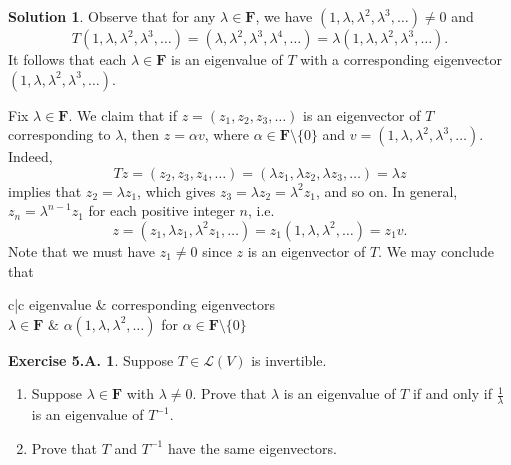\documentclass[12pt]{article}
\theoremstyle{definition}
\theoremstyle{exercise}
\newtheorem{exercise}{Exercise 5.A.}
\theoremstyle{solution}
\newtheorem*{solution}{Solution}
\newcommand{\lmap}{\mathcal{L}}
\newcommand{\F}{\mathbf{F}}
\begin{document}
\begin{solution}
    Observe that for any \( \lambda \in \F \), we have \( (1, \lambda, \lambda^2, \lambda^3, \ldots) \neq 0 \) and
    \[
        T(1, \lambda, \lambda^2, \lambda^3, \ldots) = (\lambda, \lambda^2, \lambda^3, \lambda^4, \ldots) = \lambda(1, \lambda, \lambda^2, \lambda^3, \ldots).
    \]
    It follows that each \( \lambda \in \F \) is an eigenvalue of \( T \) with a corresponding eigenvector \( (1, \lambda, \lambda^2, \lambda^3, \ldots) \).

    Fix \( \lambda \in \F \). We claim that if \( z = (z_1, z_2, z_3, \ldots) \) is an eigenvector of \( T \) corresponding to \( \lambda \), then \( z = \alpha v \), where \( \alpha \in \F \setminus \{ 0 \} \) and \( v = (1, \lambda, \lambda^2, \lambda^3, \ldots) \). Indeed,
    \[
        Tz = (z_2, z_3, z_4, \ldots) = (\lambda z_1, \lambda z_2, \lambda z_3, \ldots) = \lambda z
    \]
    implies that \( z_2 = \lambda z_1 \), which gives \( z_3 = \lambda z_2 = \lambda^2 z_1 \), and so on. In general, \( z_n = \lambda^{n-1} z_1 \) for each positive integer \( n \), i.e.\
    \[
        z = (z_1, \lambda z_1, \lambda^2 z_1, \ldots) = z_1 (1, \lambda, \lambda^2, \ldots) = z_1 v.
    \]
    Note that we must have \( z_1 \neq 0 \) since \( z \) is an eigenvector of \( T \). We may conclude that
    \begin{center}
        \begin{tblr}{c|c}
            eigenvalue & corresponding eigenvectors \\
            \hline
            \( \lambda \in \F \) & \( \alpha (1, \lambda, \lambda^2, \ldots) \) for \( \alpha \in \F \setminus \{ 0 \} \)
        \end{tblr}
    \end{center}
\end{solution}

\begin{exercise}
\label{ex:21}
    Suppose \( T \in \lmap(V) \) is invertible.
    \begin{enumerate}
        \item Suppose \( \lambda \in \F \) with \( \lambda \neq 0 \). Prove that \( \lambda \) is an eigenvalue of \( T \) if and only if \( \tfrac{1}{\lambda} \) is an eigenvalue of \( T^{-1} \).

        \item Prove that \( T \) and \( T^{-1} \) have the same eigenvectors.
    \end{enumerate}
\end{exercise}
\end{document}
